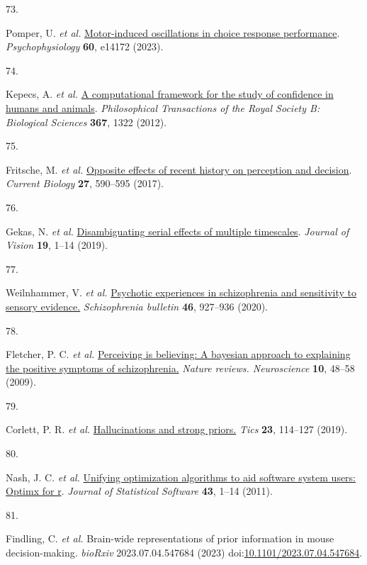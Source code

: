 \documentclass[
]{article}
\newlength{\cslhangindent}
\newlength{\csllabelwidth}
\newlength{\cslentryspacingunit} %
\newenvironment{CSLReferences}[2] %
 {%
  \setlength{\parindent}{0pt}
  \ifodd #1
  \let\oldpar\par
  \def\par{\hangindent=\cslhangindent\oldpar}
  \fi
  \setlength{\parskip}{#2\cslentryspacingunit}
 }%
 {}
\newcommand{\CSLLeftMargin}[1]{\parbox[t]{\csllabelwidth}{#1}}
\newcommand{\CSLRightInline}[1]{\parbox[t]{\linewidth - \csllabelwidth}{#1}\break}
\begin{document}
\begin{CSLReferences}{0}{0}
\leavevmode{}%
\CSLLeftMargin{73. }%
\CSLRightInline{Pomper, U. \emph{et al.}
\href{https://doi.org/10.1111/PSYP.14172}{Motor-induced oscillations in
choice response performance}. \emph{Psychophysiology} \textbf{60},
e14172 (2023).}

\leavevmode{}%
\CSLLeftMargin{74. }%
\CSLRightInline{Kepecs, A. \emph{et al.}
\href{https://doi.org/10.1098/RSTB.2012.0037}{A computational framework
for the study of confidence in humans and animals}. \emph{Philosophical
Transactions of the Royal Society B: Biological Sciences} \textbf{367},
1322 (2012).}

\leavevmode{}%
\CSLLeftMargin{75. }%
\CSLRightInline{Fritsche, M. \emph{et al.}
\href{https://doi.org/10.1016/j.cub.2017.01.006}{Opposite effects of
recent history on perception and decision}. \emph{Current Biology}
\textbf{27}, 590--595 (2017).}

\leavevmode{}%
\CSLLeftMargin{76. }%
\CSLRightInline{Gekas, N. \emph{et al.}
\href{https://doi.org/10.1167/19.6.24}{Disambiguating serial effects of
multiple timescales}. \emph{Journal of Vision} \textbf{19}, 1--14
(2019).}

\leavevmode{}%
\CSLLeftMargin{77. }%
\CSLRightInline{Weilnhammer, V. \emph{et al.}
\href{https://www.ncbi.nlm.nih.gov/pubmed/32090246}{Psychotic
experiences in schizophrenia and sensitivity to sensory evidence.}
\emph{Schizophrenia bulletin} \textbf{46}, 927--936 (2020).}

\leavevmode{}%
\CSLLeftMargin{78. }%
\CSLRightInline{Fletcher, P. C. \emph{et al.}
\href{https://doi.org/10.1038/nrn2536}{Perceiving is believing: A
bayesian approach to explaining the positive symptoms of schizophrenia.}
\emph{Nature reviews. Neuroscience} \textbf{10}, 48--58 (2009).}

\leavevmode{}%
\CSLLeftMargin{79. }%
\CSLRightInline{Corlett, P. R. \emph{et al.}
\href{https://doi.org/10.1016/j.tics.2018.12.001}{Hallucinations and
strong priors.} \emph{Tics} \textbf{23}, 114--127 (2019).}

\leavevmode{}%
\CSLLeftMargin{80. }%
\CSLRightInline{Nash, J. C. \emph{et al.}
\href{https://doi.org/10.18637/JSS.V043.I09}{Unifying optimization
algorithms to aid software system users: Optimx for r}. \emph{Journal of
Statistical Software} \textbf{43}, 1--14 (2011).}

\leavevmode{}%
\CSLLeftMargin{81. }%
\CSLRightInline{Findling, C. \emph{et al.} Brain-wide representations of
prior information in mouse decision-making. \emph{bioRxiv}
2023.07.04.547684 (2023)
doi:\href{https://doi.org/10.1101/2023.07.04.547684}{10.1101/2023.07.04.547684}.}

\end{CSLReferences}
\end{document}
